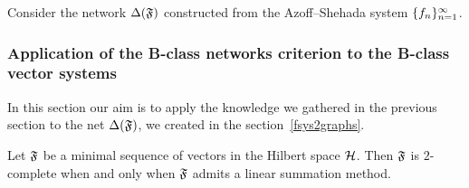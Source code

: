 \documentclass[12pt]{article}
\begin{document}
      Consider the network $\net(\fsys)$ constructed from the Azoff--Shehada system $\seq{f}$.



    \subsubsection{Application of the B-class networks criterion to the B-class vector systems}
      In this section our aim is to apply the knowledge we gathered in the previous section to
      the net $\net(\fsys)$, we created in the section~\ref{fsys2graphs}.
      \begin{theorem}
        \label{completeness-thm}
        Let $\fsys$ be a minimal sequence of vectors in the Hilbert space $\cal{H}$.
        Then $\fsys$ is $2$-complete when and only when $\fsys$ admits a linear summation method.
      \end{theorem}
\end{document}
